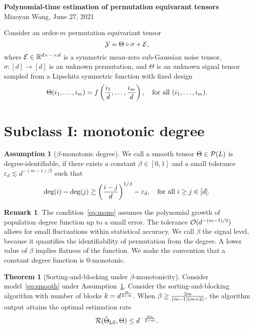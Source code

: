 \documentclass[10pt]{article}
\theoremstyle{definition}
\newtheorem{thm}{Theorem}[section]
\theoremstyle{definition}
\newtheorem{assumption}{Assumption}
\newtheorem{rmk}{Remark}
\theoremstyle{definition}
\begin{document}
\begin{center}
{\bf \large Polynomial-time estimation of permutation equivarant tensors}\\

{Miaoyan Wang, June 27, 2021}
\end{center}
Consider an order-$m$ permutation equivariant tensor
\begin{equation}\label{eq:smooth}
\mathcal{Y}=\Theta\circ \sigma +\mathcal{E},
\end{equation}
where $\mathcal{E}\in\mathbb{R}^{d\times\cdots \times d}$ is a symmetric mean-zero sub-Gaussian noise tensor, $\sigma\colon[d]\to[d]$ is an unknown permutation, and $\Theta$ is an unknown signal tensor sampled from a Lipschitz symmetric function with fixed design
\[
 \Theta(i_1,\ldots,i_m)=f\left({i_1\over d},\ldots,{i_m\over d}\right), \quad \text{for all }(i_1,\ldots,i_m). 
 \]
\section{Subclass I: monotonic degree}

\begin{assumption}[$\beta$-monotonic degree]\label{ass:degree}
We call a smooth tensor $\Theta\in\mathcal{P}(L)$ is degree-identifiable, if there exists a constant $\beta\in[0,1]$ and a small tolerance $\varepsilon_d\lesssim d^{-(m-1)/2}$ such that
\begin{equation}\label{eq:mono}
\text{deg}(i)-\text{deg}(j)\gtrsim \left({i-j\over d}\right)^{1/\beta}-\varepsilon_d, \quad \text{for all }i\geq j \in[d].
\end{equation}
\end{assumption}
\begin{rmk} 
The condition~\eqref{eq:mono} assumes the polynomial growth of population degree function up to a small error. The tolerance $\mathcal{O}(d^{-(m-1)/2})$ allows for small fluctuations within statistical accuracy. We call $\beta$ the signal level, because it quantifies the identifiability of permutation from the degree. A lower value  of $\beta$ implies flatness of the function. We make the convention that a constant degree function is $0$-monotonic. 
\end{rmk}
\begin{thm}[Sorting-and-blocking under $\beta$-monotonicity]\label{thm:main}
Consider model~\ref{eq:smooth} under Assumption~\ref{ass:degree}. Consider the sorting-and-blocking algorithm with number of blocks $k=d^{m\over 2+m}$. When $\beta \geq {2m\over (m-1)(m+2)}$, the algorithm output attains the optimal estimation rate 
\[
\mathcal{R}(\hat \Theta_{\text{LS}}, \Theta) \leq d^{-{2m\over 2+m}}.
\]
\end{thm}
\end{document}
